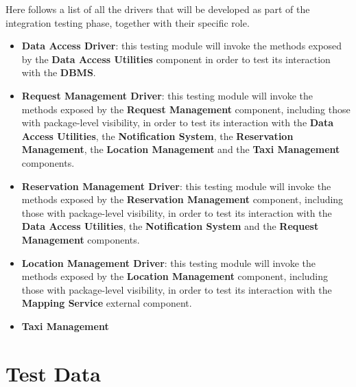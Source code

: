 Here follows a list of all the drivers that will be developed as part of the integration testing phase, together with their specific role.
\begin{itemize}
	\item \textbf{Data Access Driver}: this testing module will invoke the methods exposed by the \textbf{Data Access Utilities} component in order to test its interaction with the \textbf{DBMS}.
	\item \textbf{Request Management Driver}: this testing module will invoke the methods exposed by the \textbf{Request Management} component, including those with package-level visibility, in order to test its interaction with the \textbf{Data Access Utilities}, the \textbf{Notification System}, the \textbf{Reservation Management}, the \textbf{Location Management} and the \textbf{Taxi Management} components. 
	\item \textbf{Reservation Management Driver}: this testing module will invoke the methods exposed by the \textbf{Reservation Management} component, including those with package-level visibility, in order to test its interaction with the \textbf{Data Access Utilities}, the \textbf{Notification System} and the \textbf{Request Management} components. 
	\item \textbf{Location Management Driver}: this testing module will invoke the methods exposed by the \textbf{Location Management} component, including those with package-level visibility, in order to test its interaction with the \textbf{Mapping Service} external component.
	\item \textbf{Taxi Management}
\end{itemize}
\section{Test Data}